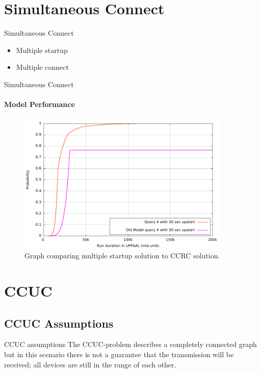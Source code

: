 \section{Simultaneous Connect}
\begin{frame}{Simultaneous Connect}
  \begin{itemize}
    \item Multiple startup
    \item Multiple connect
  \end{itemize}
\end{frame}

\begin{frame}{Simultaneous Connect}
\framesubtitle{Model Performance}
\footnotesize
  \begin{figure}[ht]
  \includegraphics[width=0.9\textwidth]{images/graph.pdf} 
\caption{Graph comparing multiple startup solution to CCRC solution.}
\label{fig:ConnectQueryTime}
\end{figure}
\end{frame}

\section{CCUC}
\subsection{CCUC Assumptions}
\begin{frame}{CCUC assumptions}
The CCUC-problem describes a completely connected graph but in this scenario there is not a guarantee that the transmission will be received; all devices are still in the range of each other.
\end{frame}

